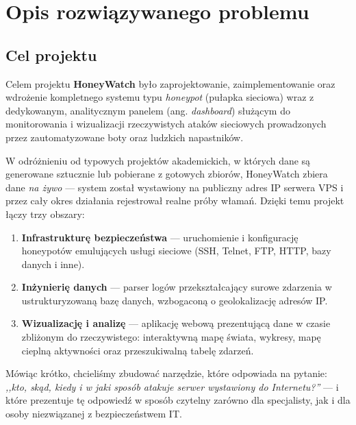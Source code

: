 \documentclass[12pt,a4paper]{report}
\begin{document}
\chapter{Opis rozwiązywanego problemu}
\label{ch:problem}

\section{Cel projektu}

Celem projektu \textbf{HoneyWatch} było zaprojektowanie, zaimplementowanie oraz
wdrożenie kompletnego systemu typu \emph{honeypot} (pułapka sieciowa) wraz
z dedykowanym, analitycznym panelem (ang. \emph{dashboard}) służącym do
monitorowania i wizualizacji rzeczywistych ataków sieciowych prowadzonych przez
zautomatyzowane boty oraz ludzkich napastników.

W odróżnieniu od typowych projektów akademickich, w których dane są generowane
sztucznie lub pobierane z gotowych zbiorów, HoneyWatch zbiera dane
\emph{na żywo} --- system został wystawiony na publiczny adres IP serwera VPS
i przez cały okres działania rejestrował realne próby włamań. Dzięki temu projekt
łączy trzy obszary:

\begin{enumerate}
  \item \textbf{Infrastrukturę bezpieczeństwa} --- uruchomienie i konfigurację
        honeypotów emulujących usługi sieciowe (SSH, Telnet, FTP, HTTP, bazy
        danych i inne).
  \item \textbf{Inżynierię danych} --- parser logów przekształcający surowe
        zdarzenia w ustrukturyzowaną bazę danych, wzbogaconą o geolokalizację
        adresów IP.
  \item \textbf{Wizualizację i analizę} --- aplikację webową prezentującą dane
        w czasie zbliżonym do rzeczywistego: interaktywną mapę świata, wykresy,
        mapę cieplną aktywności oraz przeszukiwalną tabelę zdarzeń.
\end{enumerate}

Mówiąc krótko, chcieliśmy zbudować narzędzie, które odpowiada na pytanie:
\emph{,,kto, skąd, kiedy i w jaki sposób atakuje serwer wystawiony do
Internetu?''} --- i które prezentuje tę odpowiedź w sposób czytelny zarówno dla
specjalisty, jak i dla osoby niezwiązanej z bezpieczeństwem IT.
\end{document}
